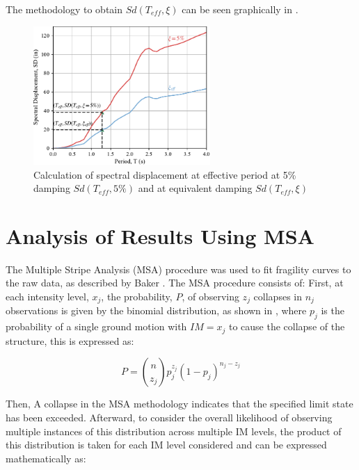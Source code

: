 The methodology to obtain $Sd(T_{eff},\xi)$  can be seen graphically in .

\begin{figure}[htbp]
	\centering
	\includegraphics[width=0.6\textwidth]{VAC Thesis 2.0/Chapter-5/figs/SpectralDisplacement_SD(Teff,xi)_Calc.pdf}
	\caption{Calculation of spectral displacement at effective period at 5\% damping $Sd(T_{eff},5\%)$ and at equivalent damping $Sd(T_{eff},\xi)$}
	\label{fig:SpectralDisplacementCalculation}
\end{figure}

\section{Analysis of Results Using MSA}

The Multiple Stripe Analysis (MSA) procedure was used to fit fragility curves to the raw data, as described by Baker \cite{Baker2015}. The MSA procedure consists of: First, at each intensity level, $x_j$, the probability, $P$, of observing $z_j$ collapses in $n_j$ observations is given by the binomial distribution, as shown in , where $p_j$ is the probability of a single ground motion with $IM = x_j$ to cause the collapse of the structure, this is expressed as:

\begin{equation}
   P=\binom{n}{z_{j}}p_{j}^{z_{j}}(1-p_{j})^{n_{j}-z_{j}} 
   \label{eq:P_MSA}
\end{equation}

Then, A collapse in the MSA methodology indicates that the specified limit state has been exceeded. Afterward, to consider the overall likelihood of observing multiple instances of this distribution across multiple IM levels, the product of this distribution is taken for each IM level considered and can be expressed mathematically as:


